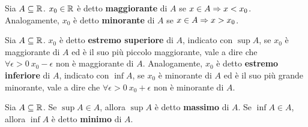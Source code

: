 \begin{definition}
  Sia $A\subseteq\mathbb{R}$.
  $x_0\in\mathbb{R}$ è detto \textbf{maggiorante} di $A$ se $x\in A\Rightarrow x<x_0$.
  Analogamente, $x_0$ è detto \textbf{minorante} di $A$ se $x\in A\Rightarrow x>x_0$.
\end{definition}

\begin{definition}
  Sia $A\subseteq\mathbb{R}$.
  $x_0$ è detto \textbf{estremo superiore} di $A$, indicato con $\sup A$, se $x_0$ è maggiorante di $A$ ed è il suo più piccolo maggiorante, vale a dire che $\forall\epsilon>0\ x_0-\epsilon$ non è maggiorante di $A$.
  Analogamente, $x_0$ è detto \textbf{estremo inferiore} di $A$, indicato con $\inf A$, se $x_0$ è minorante di $A$ ed è il suo più grande minorante, vale a dire che $\forall\epsilon>0\ x_0+\epsilon$ non è minorante di $A$.
\end{definition}

\begin{definition}
  Sia $A\subseteq\mathbb{R}$.
  Se $\sup A\in A$, allora $\sup A$ è detto \textbf{massimo} di $A$.
  Se $\inf A\in A$, allora $\inf A$ è detto \textbf{minimo} di $A$.
\end{definition}

